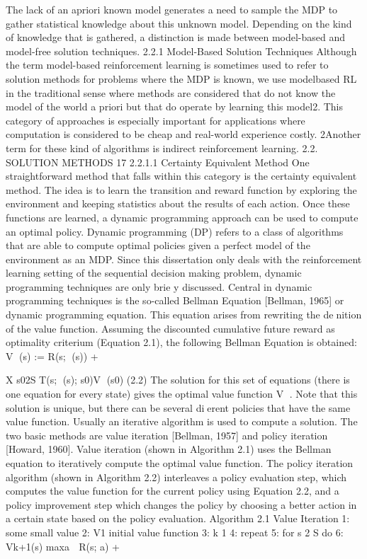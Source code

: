 The lack of an apriori known model generates a need to sample the MDP to
gather statistical knowledge about this unknown model. Depending on the kind
of knowledge that is gathered, a distinction is made between model-based and
model-free solution techniques.
2.2.1 Model-Based Solution Techniques
Although the term model-based reinforcement learning is sometimes used to
refer to solution methods for problems where the MDP is known, we use modelbased
RL in the traditional sense where methods are considered that do not
know the model of the world a priori but that do operate by learning this
model2. This category of approaches is especially important for applications
where computation is considered to be cheap and real-world experience costly.
2Another term for these kind of algorithms is indirect reinforcement learning.
2.2. SOLUTION METHODS 17
2.2.1.1 Certainty Equivalent Method
One straightforward method that falls within this category is the certainty
equivalent method. The idea is to learn the transition and reward function
by exploring the environment and keeping statistics about the results of each
action. Once these functions are learned, a dynamic programming approach can
be used to compute an optimal policy. Dynamic programming (DP) refers to
a class of algorithms that are able to compute optimal policies given a perfect
model of the environment as an MDP. Since this dissertation only deals with
the reinforcement learning setting of the sequential decision making problem,
dynamic programming techniques are only brie
y discussed.
Central in dynamic programming techniques is the so-called Bellman Equation
[Bellman, 1965] or dynamic programming equation. This equation arises
from rewriting the denition of the value function. Assuming the discounted
cumulative future reward as optimality criterium (Equation 2.1), the following
Bellman Equation is obtained:
V (s) := R(s; (s)) + 

X
s02S
T(s; (s); s0)V (s0) (2.2)
The solution for this set of equations (there is one equation for every state)
gives the optimal value function V . Note that this solution is unique, but there
can be several dierent policies that have the same value function. Usually
an iterative algorithm is used to compute a solution. The two basic methods
are value iteration [Bellman, 1957] and policy iteration [Howard, 1960]. Value
iteration (shown in Algorithm 2.1) uses the Bellman equation to iteratively
compute the optimal value function. The policy iteration algorithm (shown in
Algorithm 2.2) interleaves a policy evaluation step, which computes the value
function for the current policy using Equation 2.2, and a policy improvement
step which changes the policy by choosing a better action in a certain state
based on the policy evaluation.
Algorithm 2.1 Value Iteration
1:    some small value
2: V1   initial value function
3: k   1
4: repeat
5: for s 2 S do
6: Vk+1(s)   maxa

R(s; a) + 

